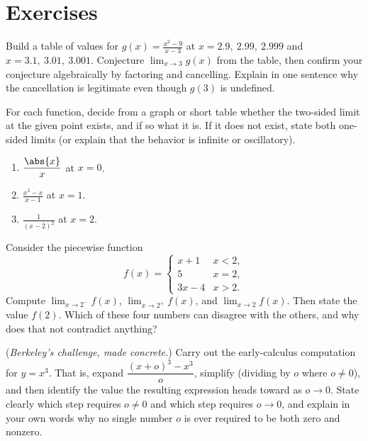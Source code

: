 \section{Exercises}

\begin{exercise}
Build a table of values for $\displaystyle g(x) = \frac{x^2 - 9}{x - 3}$ at $x = 2.9,\ 2.99,\
2.999$ and $x = 3.1,\ 3.01,\ 3.001$. Conjecture $\lim_{x\to 3} g(x)$ from the table, then confirm
your conjecture algebraically by factoring and cancelling. Explain in one sentence why the
cancellation is legitimate even though $g(3)$ is undefined.
\end{exercise}

\begin{exercise}
For each function, decide from a graph or short table whether the two-sided limit at the given
point exists, and if so what it is. If it does not exist, state both one-sided limits (or explain
that the behavior is infinite or oscillatory).
\begin{enumerate}[label=(\alph*)]
  \item $\displaystyle \frac{\abs{x}}{x}$ at $x = 0$.
  \item $\displaystyle \frac{x^3 - x}{x - 1}$ at $x = 1$.
  \item $\displaystyle \frac{1}{(x-2)^2}$ at $x = 2$.
\end{enumerate}
\end{exercise}

\begin{exercise}
Consider the piecewise function
\[
  f(x) = \begin{cases} x + 1 & x < 2, \\ 5 & x = 2, \\ 3x - 4 & x > 2. \end{cases}
\]
Compute $\lim_{x\to 2^-} f(x)$, $\lim_{x\to 2^+} f(x)$, and $\lim_{x\to 2} f(x)$. Then state the
value $f(2)$. Which of these four numbers can disagree with the others, and why does that not
contradict anything?
\end{exercise}

\begin{exercise}
(\emph{Berkeley's challenge, made concrete.}) Carry out the early-calculus computation for
$y = x^3$. That is, expand $\dfrac{(x+o)^3 - x^3}{o}$, simplify (dividing by $o$ where $o\neq 0$),
and then identify the value the resulting expression heads toward as $o\to 0$. State clearly which
step requires $o\neq 0$ and which step requires $o\to 0$, and explain in your own words why no
single number $o$ is ever required to be both zero and nonzero.
\end{exercise}

